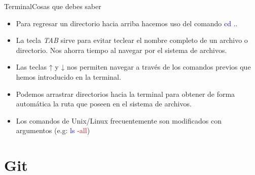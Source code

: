 \documentclass[10pt]{beamer}
\begin{document}
\begin{frame}{Terminal}{Cosas que debes saber}

\begin{block}{}

\begin{itemize}
        \item Para regresar un directorio hacia arriba hacemos uso del comando \textcolor{blue}{cd ..}
        \item La tecla \textit{TAB} sirve para evitar teclear el nombre completo de un archivo o directorio. Nos ahorra tiempo al navegar por el sistema de archivos.
        \item Las teclas ↑ y ↓ nos permiten navegar a través de los comandos previos que hemos introducido en la terminal.
        \item Podemos arrastrar directorios hacia la terminal para obtener de forma automática la ruta que poseen en el sistema de archivos.
        \item Los comandos de Unix/Linux frecuentemente son modificados con argumentos (e.g: \textcolor{blue}{ls} \textcolor{red}{-all})
\end{itemize}
    
\end{block}

\end{frame}

\section{Git}
\end{document}

